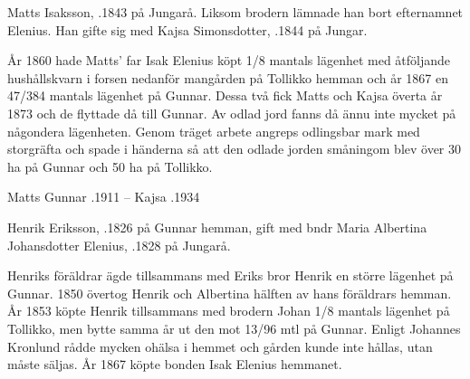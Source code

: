 Matts Isaksson, .1843 på Jungarå. Liksom brodern lämnade han bort efternamnet Elenius. Han gifte sig med Kajsa Simonsdotter,	.1844 på Jungar.
\begin{jhchildren}
  \item {}
  \item {}
  \item {}
  \item {}
  \item {}
  \item {}
  \item {}
  \item {}
\end{jhchildren}
År 1860 hade Matts' far Isak Elenius köpt 1/8 mantals lägenhet med åtföljande hushållskvarn i forsen nedanför mangården på Tollikko hemman och år 1867 en 47/384 mantals lägenhet på Gunnar. Dessa två fick Matts och Kajsa överta år 1873 och de flyttade då till Gunnar. Av odlad jord fanns då ännu inte mycket på någondera lägenheten. Genom träget arbete angreps odlingsbar mark med storgräfta och spade i händerna så att den odlade jorden småningom blev över 30 ha på Gunnar och 50 ha på Tollikko.

Matts Gunnar .1911  --  Kajsa .1934


Henrik Eriksson, .1826 på Gunnar hemman, gift med bndr Maria Albertina Johansdotter Elenius, .1828 på Jungarå.
\begin{jhchildren}
  \item {}
  \item {}
  \item {}
  \item {}
  \item {}
  \item {}
  \item {}
  \item {}
  \item {}
  \item {}
\end{jhchildren}
Henriks föräldrar ägde tillsammans med Eriks bror Henrik en större lägenhet på Gunnar. 1850 övertog Henrik och Albertina hälften av hans föräldrars hemman. År 1853 köpte Henrik tillsammans med brodern Johan 1/8 mantals lägenhet på Tollikko, men bytte samma år ut den mot 13/96 mtl på Gunnar. Enligt Johannes Kronlund rådde mycken ohälsa i hemmet och gården kunde inte hållas, utan måste säljas. År 1867 köpte bonden Isak Elenius hemmanet.

